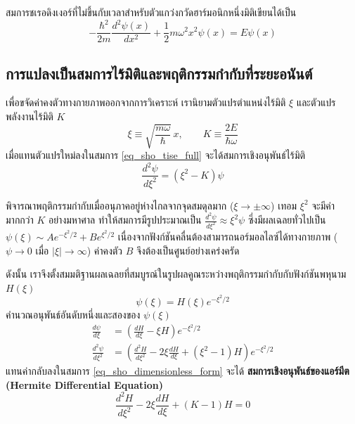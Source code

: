 สมการชเรอดิงเงอร์ที่ไม่ขึ้นกับเวลาสำหรับตัวแกว่งกวัดฮาร์มอนิกหนึ่งมิติเขียนได้เป็น
\begin{equation}
-\frac{\hbar^2}{2m} \frac{d^2\psi(x)}{dx^2} + \frac{1}{2}m\omega^2 x^2 \psi(x) = E\psi(x) \label{eq_sho_tise_full}
\end{equation}

\subsection{การแปลงเป็นสมการไร้มิติและพฤติกรรมกำกับที่ระยะอนันต์}
เพื่อขจัดค่าคงตัวทางกายภาพออกจากการวิเคราะห์ เรานิยามตัวแปรตำแหน่งไร้มิติ $\xi$ และตัวแปรพลังงานไร้มิติ $K$
\begin{equation}
\xi \equiv \sqrt{\frac{m\omega}{\hbar}} \, x, \qquad K \equiv \frac{2E}{\hbar\omega}
\end{equation}
เมื่อแทนตัวแปรใหม่ลงในสมการ \eqref{eq_sho_tise_full} จะได้สมการเชิงอนุพันธ์ไร้มิติ
\begin{equation}
\frac{d^2\psi}{d\xi^2} = (\xi^2 - K)\psi \label{eq_sho_dimensionless_form}
\end{equation}

พิจารณาพฤติกรรมกำกับเมื่ออนุภาคอยู่ห่างไกลจากจุดสมดุลมาก ($\xi \to \pm\infty$) เทอม $\xi^2$ จะมีค่ามากกว่า $K$ อย่างมหาศาล ทำให้สมการมีรูปประมาณเป็น $\frac{d^2\psi}{d\xi^2} \approx \xi^2 \psi$ ซึ่งมีผลเฉลยทั่วไปเป็น $\psi(\xi) \sim A e^{-\xi^2/2} + B e^{\xi^2/2}$ เนื่องจากฟังก์ชันคลื่นต้องสามารถนอร์มอลไลซ์ได้ทางกายภาพ ($\psi \to 0$ เมื่อ $|\xi| \to \infty$) ค่าคงตัว $B$ จึงต้องเป็นศูนย์อย่างเคร่งครัด

ดังนั้น เราจึงตั้งสมมติฐานผลเฉลยที่สมบูรณ์ในรูปผลคูณระหว่างพฤติกรรมกำกับกับฟังก์ชันพหุนาม $H(\xi)$
\begin{equation}
\psi(\xi) = H(\xi) e^{-\xi^2/2}
\end{equation}
คำนวณอนุพันธ์อันดับหนึ่งและสองของ $\psi(\xi)$
\begin{align}
\frac{d\psi}{d\xi} &= \left( \frac{dH}{d\xi} - \xi H \right) e^{-\xi^2/2} \\
\frac{d^2\psi}{d\xi^2} &= \left( \frac{d^2H}{d\xi^2} - 2\xi \frac{dH}{d\xi} + (\xi^2 - 1)H \right) e^{-\xi^2/2}
\end{align}
แทนค่ากลับลงในสมการ \eqref{eq_sho_dimensionless_form} จะได้ \textbf{สมการเชิงอนุพันธ์ของแอร์มีต (Hermite Differential Equation)}
\begin{equation}
\frac{d^2H}{d\xi^2} - 2\xi \frac{dH}{d\xi} + (K - 1)H = 0 \label{eq_hermite_diffeq}
\end{equation}

